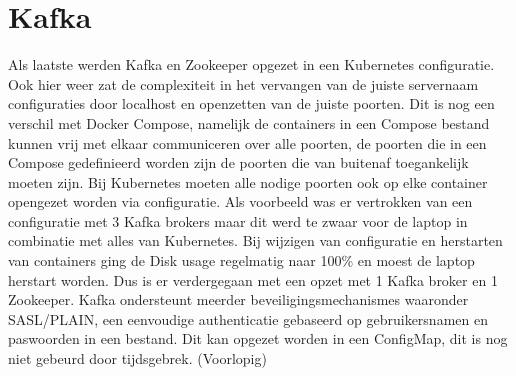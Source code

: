 \section{Kafka}

Als laatste werden Kafka en Zookeeper opgezet in een Kubernetes configuratie. Ook hier weer zat de complexiteit in het vervangen van de juiste servernaam configuraties door localhost en openzetten van de juiste poorten.
Dit is nog een verschil met Docker Compose, namelijk de containers in een Compose bestand kunnen vrij met elkaar communiceren over alle poorten, de poorten die in een Compose gedefinieerd worden zijn de poorten die van buitenaf toegankelijk moeten zijn. Bij Kubernetes moeten alle nodige poorten ook op elke container opengezet worden via configuratie.
\newline
\newline
Als voorbeeld was er vertrokken van een configuratie met 3 Kafka brokers maar dit werd te zwaar voor de laptop in combinatie met alles van Kubernetes. Bij wijzigen van configuratie en herstarten van containers ging de Disk usage regelmatig naar 100\% en moest de laptop herstart worden.
Dus is er verdergegaan met een opzet met 1 Kafka broker en 1 Zookeeper.
\newline
\newline
Kafka ondersteunt meerder beveiligingsmechanismes waaronder SASL/PLAIN, een eenvoudige authenticatie gebaseerd op gebruikersnamen en paswoorden in een bestand.
\newline
\newline
Dit kan opgezet worden in een ConfigMap, dit is nog niet gebeurd door tijdsgebrek. (Voorlopig)
\newline
\newline

